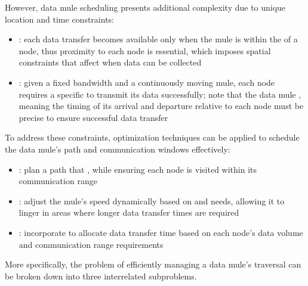 \documentclass[a4paper, 12pt]{report}
\begin{document}
    However, data mule scheduling presents additional complexity due to unique location and time constraints:

    \begin{itemize}
        \item {}: each data transfer becomes available only when the mule is within the  of a node, thus proximity to each node is essential, which imposes spatial constraints that affect when data can be collected
        \item {}: given a fixed bandwidth and a continuously moving mule, each node requires a specific  to transmit its data successfully; note that the data mule , meaning the timing of its arrival and departure relative to each node must be precise to ensure successful data transfer
    \end{itemize}

    To address these constraints, optimization techniques can be applied to schedule the data mule's path and communication windows effectively:

    \begin{itemize}
        \item {}: plan a path that , while ensuring each node is visited within its communication range
        \item {}: adjust the mule's speed dynamically based on  and  needs, allowing it to linger in areas where longer data transfer times are required
        \item {}: incorporate  to allocate data transfer time based on each node's data volume and communication range requirements
    \end{itemize}

    More specifically, the problem of efficiently managing a data mule's traversal can be broken down into three interrelated subproblems.
\end{document}

